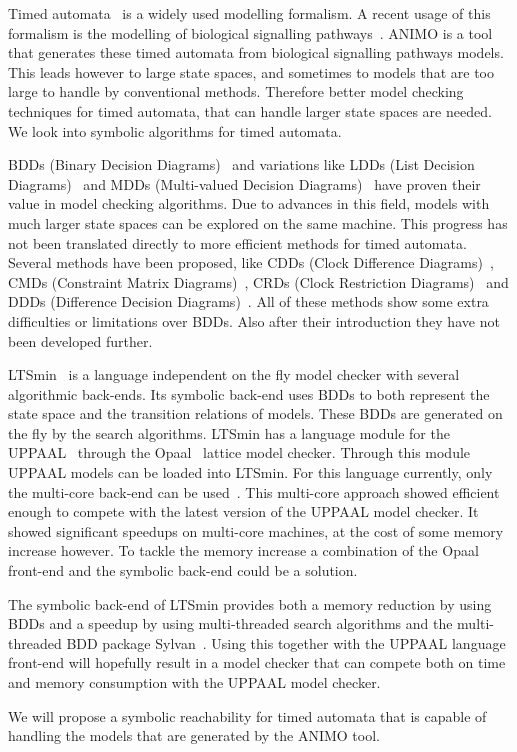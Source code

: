 Timed automata~\cite{Alur1994183} is a widely used modelling formalism. A recent usage of this formalism is the modelling of biological signalling pathways~\cite{DBLP:conf/bibe/SchivoSWCVKLPP12}. ANIMO is a tool that generates these timed automata from biological signalling pathways models. This leads however to large state spaces, and sometimes to models that are too large to handle by conventional methods. Therefore better model checking techniques for timed automata, that can handle larger state spaces are needed. We look into symbolic algorithms for timed automata.

BDDs (Binary Decision Diagrams)~\cite{Akers:1978:BDD:1310167.1310815,1676819} and variations like LDDs (List Decision Diagrams)~\cite{so62465} and MDDs (Multi-valued Decision Diagrams)~\cite{129849} have proven their value in model checking algorithms. Due to advances in this field, models with much larger state spaces can be explored on the same machine. This progress has not been translated directly to more efficient methods for timed automata. Several methods have been proposed, like CDDs (Clock Difference Diagrams)~\cite{BRICS19491}, CMDs (Constraint Matrix Diagrams)~\cite{5702245}, CRDs (Clock Restriction Diagrams)~\cite{crds} and DDDs (Difference Decision Diagrams)~\cite{ddds, ddd-datastructure-99}. All of these methods show some extra difficulties or limitations over BDDs. Also after their introduction they have not been developed further.

LTSmin~\cite{eemcs18152,ltsmin-mc:nmf2011} is a language independent on the fly model checker with several algorithmic back-ends. Its symbolic back-end uses BDDs to both represent the state space and the transition relations of models. These BDDs are generated on the fly by the search algorithms. LTSmin has a language module for the UPPAAL~\cite{UPPAAL} through the Opaal~\cite{opaal} lattice model checker. Through this module UPPAAL models can be loaded into LTSmin. For this language currently, only the multi-core back-end can be used~\cite{eemcs21972}. This multi-core approach showed efficient enough to compete with the latest version of the UPPAAL model checker. It showed significant speedups on multi-core machines, at the cost of some memory increase however. To tackle the memory increase a combination of the Opaal front-end and the symbolic back-end could be a solution.

The symbolic back-end of LTSmin provides both a memory reduction by using BDDs and a speedup by using multi-threaded search algorithms and the multi-threaded BDD package Sylvan~\cite{sylvan}. Using this together with the UPPAAL language front-end will hopefully result in a model checker that can compete both on time and memory consumption with the UPPAAL model checker.

We will propose a symbolic reachability for timed automata that is capable of handling the models that are generated by the ANIMO tool.